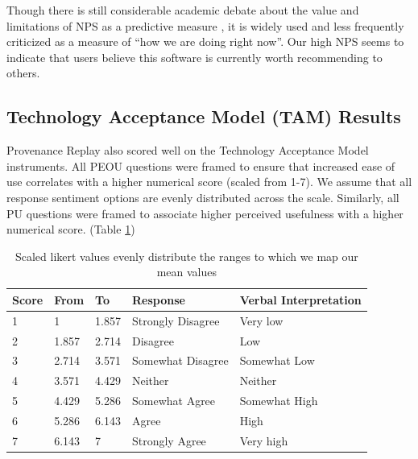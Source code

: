 Though there is still considerable academic debate about the value and
limitations of NPS as a predictive measure \parencite[Table 1]{baehre_use_2022},
it is widely used and less frequently criticized as a measure of “how we are
doing right now”. Our high NPS seems to indicate that users believe this
software is currently worth recommending to others.

\subsection{Technology Acceptance Model (TAM) Results}

Provenance Replay also scored well on the Technology Acceptance Model
instruments. All PEOU questions were framed to ensure that increased ease of use
correlates with a higher numerical score (scaled from 1-7). We assume that all
response sentiment options are evenly distributed across the scale. Similarly,
all PU questions were framed to associate higher perceived usefulness with a
higher numerical score. (Table \ref{tab:scaled_likert_vals})

\begin{table}[htp]
        \begin{tabular}{|p{}|p{}|p{}|p{}|p{}|}
        \hline
        Score & From  & To    & Response          & Verbal Interpretation \\ \hline
        1     & 1     & 1.857 & Strongly Disagree & Very low              \\
        2     & 1.857 & 2.714 & Disagree          & Low                   \\
        3     & 2.714 & 3.571 & Somewhat Disagree & Somewhat Low          \\
        4     & 3.571 & 4.429 & Neither           & Neither               \\
        5     & 4.429 & 5.286 & Somewhat Agree    & Somewhat High         \\
        6     & 5.286 & 6.143 & Agree             & High                  \\
        7     & 6.143 & 7     & Strongly Agree    & Very high             \\ \hline
        \end{tabular}
    \caption[Scaled likert values for TAM interpretation]%
    {Scaled likert values evenly distribute the ranges to which we map our mean values}
    \label{tab:scaled_likert_vals}
\end{table}

